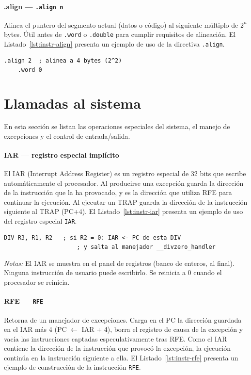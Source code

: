 \documentclass[../main.tex]{subfiles}
\begin{document}
\paragraph*{.align --- \texttt{.align n}}
Alinea el puntero del segmento actual (datos o código) al siguiente múltiplo de $2^n$ bytes. Útil antes de \texttt{.word} o \texttt{.double} para cumplir requisitos de alineación.
El Listado~\ref{lst:instr-align} presenta un ejemplo de uso de la directiva \texttt{.align}.

\begin{lstlisting}[caption={.align},label={lst:instr-align}]
	.align 2  ; alinea a 4 bytes (2^2)
	.word 0
\end{lstlisting}


\section{Llamadas al sistema}

En esta sección se listan las operaciones especiales del sistema, el manejo de excepciones y el control de entrada/salida.

\paragraph*{IAR --- registro especial implícito}
El IAR (Interrupt Address Register) es un registro especial de 32 bits que escribe automáticamente el procesador. Al producirse una excepción guarda la dirección de la instrucción que la ha provocado, y es la dirección que utiliza RFE para continuar la ejecución. Al ejecutar un TRAP guarda la dirección de la instrucción siguiente al TRAP (PC+4).
El Listado~\ref{lst:instr-iar} presenta un ejemplo de uso del registro especial \texttt{IAR}.

\begin{lstlisting}[caption={IAR},label={lst:instr-iar}]
	DIV R3, R1, R2   ; si R2 = 0: IAR <- PC de esta DIV
	                 ; y salta al manejador __divzero_handler
\end{lstlisting}
\textit{Notas:} El IAR se muestra en el panel de registros (banco de enteros, al final). Ninguna instrucción de usuario puede escribirlo. Se reinicia a 0 cuando el procesador se reinicia.

\paragraph*{RFE --- \texttt{RFE}}
Retorna de un manejador de excepciones. Carga en el PC la dirección guardada en el IAR más 4 (PC $\leftarrow$ IAR + 4), borra el registro de causa de la excepción y vacía las instrucciones captadas especulativamente tras RFE. Como el IAR contiene la dirección de la instrucción que provocó la excepción, la ejecución continúa en la instrucción siguiente a ella.
El Listado~\ref{lst:instr-rfe} presenta un ejemplo de construcción de la instrucción \texttt{RFE}.
\end{document}
